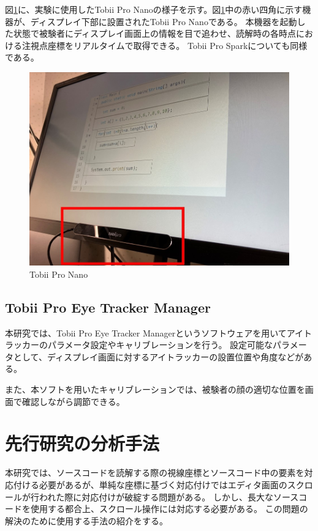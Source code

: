 \documentclass[paper=a4paper,fontsize=11pt]{jlreq}
\begin{document}
    図\ref{tobii_nano}に、実験に使用したTobii Pro Nanoの様子を示す。図\ref{tobii_nano}中の赤い四角に示す機器が、ディスプレイ下部に設置されたTobii Pro Nanoである。
    本機器を起動した状態で被験者にディスプレイ画面上の情報を目で追わせ、読解時の各時点における注視点座標をリアルタイムで取得できる。
    Tobii Pro Sparkについても同様である。
    \begin{figure}[htbp]
      \centering
      \includegraphics[width=0.8\linewidth]{tobii_nano.jpg}
      \caption{Tobii Pro Nano}
      \label{tobii_nano}
    \end{figure}
    \FloatBarrier
    \clearpage

    \subsection{Tobii Pro Eye Tracker Manager}
      本研究では、Tobii Pro Eye Tracker Manager\cite{manager}というソフトウェアを用いてアイトラッカーのパラメータ設定やキャリブレーションを行う。
      設定可能なパラメータとして、ディスプレイ画面に対するアイトラッカーの設置位置や角度などがある。

      また、本ソフトを用いたキャリブレーションでは、被験者の顔の適切な位置を画面で確認しながら調節できる。

  \section{先行研究の分析手法}
    本研究では、ソースコードを読解する際の視線座標とソースコード中の要素を対応付ける必要があるが、単純な座標に基づく対応付けではエディタ画面のスクロールが行われた際に対応付けが破綻する問題がある。
    しかし、長大なソースコードを使用する都合上、スクロール操作には対応する必要がある。
    この問題の解決のために使用する手法の紹介をする。
\end{document}

